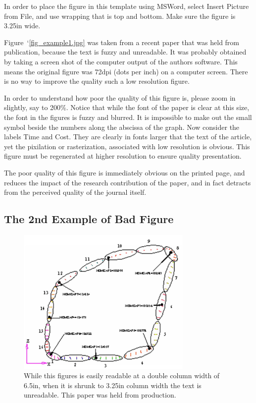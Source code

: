 \documentclass[twocolumn,10pt]{asme2ej}
\begin{document}
In order to place the figure in this template using MSWord, select Insert Picture from File, and use wrapping that is top and bottom. Make sure the figure is 3.25in wide.
 
Figure~`\ref{fig_example1.jpg}
was taken from a recent paper that was held from publication, because the text is fuzzy and unreadable. It was probably obtained by taking a screen shot of the computer output of the authors software. This means the original figure was 72dpi (dots per inch) on a computer screen. There is no way to improve the quality such a low resolution figure.
 
In order to understand how poor the quality of this figure is, please zoom in slightly, say to 200\%.  Notice that while the font of the paper is clear at this size, the font in the figures is fuzzy and blurred.  It is impossible to make out the small symbol beside the numbers along the abscissa of the graph.  Now consider the labels Time and Cost. They are clearly in fonts larger that the text of the article, yet the pixilation or rasterization, associated with low resolution is obvious. This figure must be regenerated at higher resolution to ensure quality presentation.

The poor quality of this figure is immediately obvious on the printed page, and reduces the impact of the research contribution of the paper, and in fact detracts from the perceived quality of the journal itself.



\subsection{The 2nd Example of Bad Figure}

\begin{figure} 
\centerline{\includegraphics[width=3.34in]{figure/FMANU_MD_05_1272_5.jpg}}
\caption{While this figures is easily readable at a double column width of 6.5in, when it is shrunk to 3.25in column width the text is unreadable. This paper was held from production.}
\label{fig_example2.jpg}
\end{figure}
\end{document}
